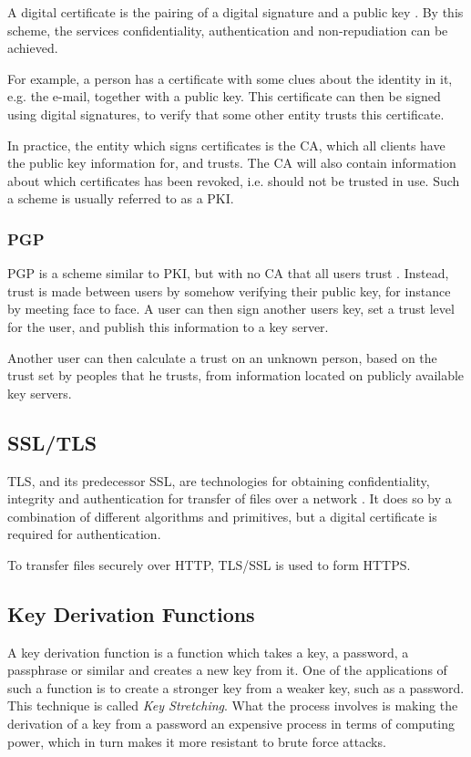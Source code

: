 \documentclass[pdftex,english,10pt,b5paper,twoside]{book}
\begin{document}
A digital certificate is the pairing of a digital signature and a public key
\cite{stallings}. By this scheme, the services confidentiality, authentication
and non-repudiation can be achieved.

For example, a person has a certificate with some clues about the identity
in it, e.g. the e-mail, together with a public key. This certificate can then
be signed using digital signatures, to verify that some other entity trusts this
certificate.

In practice, the entity which signs certificates is the \ac{CA}, which all
clients have the public key information for, and trusts. The \ac{CA} will also
contain information about which certificates has been revoked, i.e. should not
be trusted in use. Such a scheme is usually referred to as a \ac{PKI}.

\subsubsection{PGP}

\ac{PGP} is a scheme similar to \ac{PKI}, but with no \ac{CA} that all users
trust \cite{stallings}. Instead, trust is made between users by somehow
verifying their public key, for instance by meeting face to face. A user can
then sign another users key, set a trust level for the user, and publish this
information to a key server.

Another user can then calculate a trust on an unknown person, based on the trust
set by peoples that he trusts, from information located on publicly
available key servers.

\subsection{SSL/TLS}

\ac{TLS}, and its predecessor \ac{SSL}, are technologies for obtaining
confidentiality, integrity and authentication for transfer of files over a
network \cite{stallings}. It does so by a combination of different algorithms
and primitives, but a digital certificate is required for authentication.

To transfer files securely over \ac{HTTP}, \ac{TLS}/\ac{SSL} is used to form
\ac{HTTPS}.

\subsection{Key Derivation Functions}
\label{sec:PBKDF2}
A key derivation function is a function which takes a key, a password, a
passphrase or similar and creates a new key from it. One of the applications of
such a function is to create a stronger key from a weaker key, such as a
password. This technique is called \emph{Key Stretching}. What the process
involves is making the derivation of a key from a password an expensive
process in terms of computing power, which in turn makes it more resistant to
brute force attacks.
\end{document}

